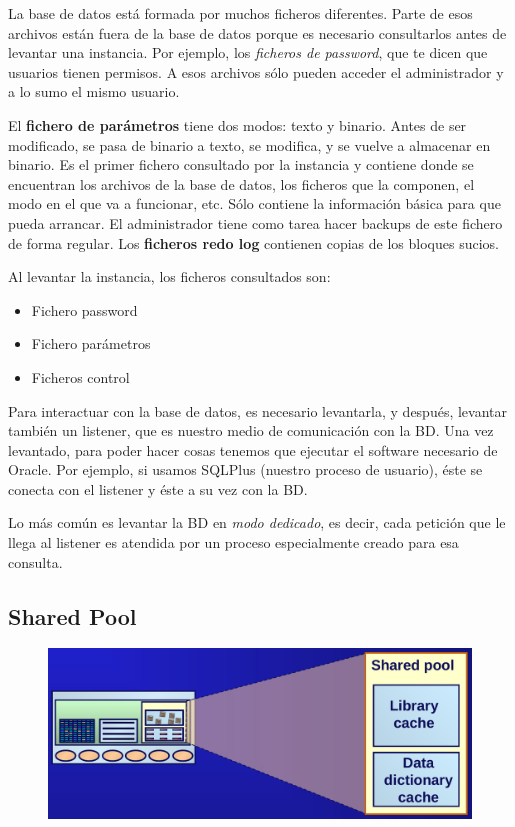 La base de datos está formada por muchos ficheros diferentes. Parte de esos archivos están fuera de la base de datos porque es necesario consultarlos antes de levantar una instancia. Por ejemplo, los \textit{ficheros de password}, que te dicen que usuarios tienen permisos. A esos archivos sólo pueden acceder el administrador y a lo sumo el mismo usuario.

El \textbf{fichero de parámetros} tiene dos modos: texto y binario. Antes de ser modificado, se pasa de binario a texto, se modifica, y se vuelve a almacenar en binario. Es el primer fichero consultado por la instancia y contiene donde se encuentran los archivos de la base de datos, los ficheros que la componen, el modo en el que va a funcionar, etc. Sólo contiene la información básica para que pueda arrancar. El administrador tiene como tarea hacer backups de este fichero de forma regular. Los \textbf{ficheros redo log} contienen copias de los bloques sucios.

Al levantar la instancia, los ficheros consultados son:
\begin{itemize}
\item Fichero password
\item Fichero parámetros
\item Ficheros control
\end{itemize}

Para interactuar con la base de datos, es necesario levantarla, y después, levantar también un listener, que es nuestro medio de comunicación con la BD. Una vez levantado, para poder hacer cosas tenemos que ejecutar el software necesario de Oracle. Por ejemplo, si usamos SQLPlus (nuestro proceso de usuario), éste se conecta con el listener y éste a su vez con la BD. 

Lo más común es levantar la BD en \textit{modo dedicado}, es decir, cada petición que le llega al listener es atendida por un proceso especialmente creado para esa consulta.

\subsection{Shared Pool}

\begin{figure}[H]
  \center
  \includegraphics[scale=0.2]{img/p3.png}
\end{figure}

